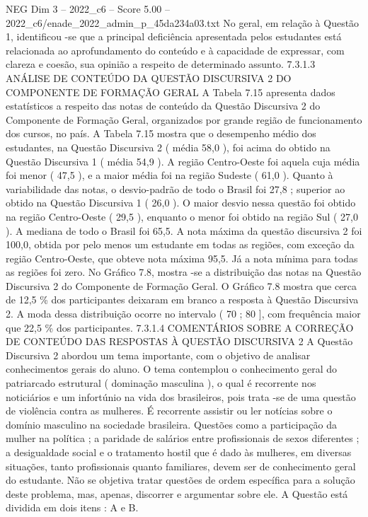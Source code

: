 \begin{textsample}{NEG Dim 3 – 2022\_c6 – Score 5.00 – 2022\_c6/enade\_2022\_admin\_p\_45da234a03.txt}
No geral, em relação à Questão 1, identificou -se que a principal deficiência apresentada pelos estudantes está relacionada ao aprofundamento do conteúdo e à capacidade de expressar, com clareza e coesão, sua opinião a respeito de determinado assunto. 7.3.1.3 ANÁLISE DE CONTEÚDO DA QUESTÃO DISCURSIVA 2 DO COMPONENTE DE FORMAÇÃO GERAL A Tabela 7.15 apresenta dados estatísticos a respeito das notas de conteúdo da Questão Discursiva 2 do Componente de Formação Geral, organizados por grande região de funcionamento dos cursos, no país.
A Tabela 7.15 mostra que o desempenho médio dos estudantes, na Questão Discursiva 2 ( média 58,0 ), foi acima do obtido na Questão Discursiva 1 ( média 54,9 ).
A região Centro-Oeste foi aquela cuja média foi menor ( 47,5 ), e a maior média foi na região Sudeste ( 61,0 ).
Quanto à variabilidade das notas, o desvio-padrão de todo o Brasil foi 27,8 ; superior ao obtido na Questão Discursiva 1 ( 26,0 ).
O maior desvio nessa questão foi obtido na região Centro-Oeste ( 29,5 ), enquanto o menor foi obtido na região Sul ( 27,0 ).
A mediana de todo o Brasil foi 65,5.
A nota máxima da questão discursiva 2 foi 100,0, obtida por pelo menos um estudante em todas as regiões, com exceção da região Centro-Oeste, que obteve nota máxima 95,5.
Já a nota mínima para todas as regiões foi zero.
No Gráfico 7.8, mostra -se a distribuição das notas na Questão Discursiva 2 do Componente de Formação Geral.
O Gráfico 7.8 mostra que cerca de 12,5 \% dos participantes deixaram em branco a resposta à Questão Discursiva 2.
A moda dessa distribuição ocorre no intervalo ( 70 ; 80 ], com frequência maior que 22,5 \% dos participantes. 7.3.1.4 COMENTÁRIOS SOBRE A CORREÇÃO DE CONTEÚDO DAS RESPOSTAS À QUESTÃO DISCURSIVA 2 A Questão Discursiva 2 abordou um tema importante, com o objetivo de analisar conhecimentos gerais do aluno.
O tema contemplou o conhecimento geral do patriarcado estrutural ( dominação masculina ), o qual é recorrente nos noticiários e um infortúnio na vida dos brasileiros, pois trata -se de uma questão de violência contra as mulheres.
É recorrente assistir ou ler notícias sobre o domínio masculino na sociedade brasileira.
Questões como a participação da mulher na política ; a paridade de salários entre profissionais de sexos diferentes ; a desigualdade social e o tratamento hostil que é dado às mulheres, em diversas situações, tanto profissionais quanto familiares, devem ser de conhecimento geral do estudante.
Não se objetiva tratar questões de ordem específica para a solução deste problema, mas, apenas, discorrer e argumentar sobre ele.
A Questão está dividida em dois itens : A e B.

\end{textsample}
